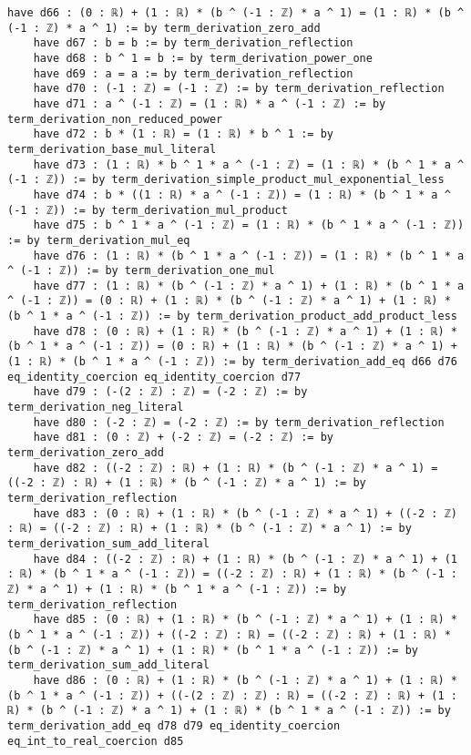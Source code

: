 \documentclass{article}
\begin{document}
\begin{tcolorbox}[colback=white!10, width=\linewidth]
\begin{lstlisting}[language=Lean4]
    have d66 : (0 : ℝ) + (1 : ℝ) * (b ^ (-1 : ℤ) * a ^ 1) = (1 : ℝ) * (b ^ (-1 : ℤ) * a ^ 1) := by term_derivation_zero_add
    have d67 : b = b := by term_derivation_reflection
    have d68 : b ^ 1 = b := by term_derivation_power_one
    have d69 : a = a := by term_derivation_reflection
    have d70 : (-1 : ℤ) = (-1 : ℤ) := by term_derivation_reflection
    have d71 : a ^ (-1 : ℤ) = (1 : ℝ) * a ^ (-1 : ℤ) := by term_derivation_non_reduced_power
    have d72 : b * (1 : ℝ) = (1 : ℝ) * b ^ 1 := by term_derivation_base_mul_literal
    have d73 : (1 : ℝ) * b ^ 1 * a ^ (-1 : ℤ) = (1 : ℝ) * (b ^ 1 * a ^ (-1 : ℤ)) := by term_derivation_simple_product_mul_exponential_less
    have d74 : b * ((1 : ℝ) * a ^ (-1 : ℤ)) = (1 : ℝ) * (b ^ 1 * a ^ (-1 : ℤ)) := by term_derivation_mul_product
    have d75 : b ^ 1 * a ^ (-1 : ℤ) = (1 : ℝ) * (b ^ 1 * a ^ (-1 : ℤ)) := by term_derivation_mul_eq
    have d76 : (1 : ℝ) * (b ^ 1 * a ^ (-1 : ℤ)) = (1 : ℝ) * (b ^ 1 * a ^ (-1 : ℤ)) := by term_derivation_one_mul
    have d77 : (1 : ℝ) * (b ^ (-1 : ℤ) * a ^ 1) + (1 : ℝ) * (b ^ 1 * a ^ (-1 : ℤ)) = (0 : ℝ) + (1 : ℝ) * (b ^ (-1 : ℤ) * a ^ 1) + (1 : ℝ) * (b ^ 1 * a ^ (-1 : ℤ)) := by term_derivation_product_add_product_less
    have d78 : (0 : ℝ) + (1 : ℝ) * (b ^ (-1 : ℤ) * a ^ 1) + (1 : ℝ) * (b ^ 1 * a ^ (-1 : ℤ)) = (0 : ℝ) + (1 : ℝ) * (b ^ (-1 : ℤ) * a ^ 1) + (1 : ℝ) * (b ^ 1 * a ^ (-1 : ℤ)) := by term_derivation_add_eq d66 d76 eq_identity_coercion eq_identity_coercion d77
    have d79 : (-(2 : ℤ) : ℤ) = (-2 : ℤ) := by term_derivation_neg_literal
    have d80 : (-2 : ℤ) = (-2 : ℤ) := by term_derivation_reflection
    have d81 : (0 : ℤ) + (-2 : ℤ) = (-2 : ℤ) := by term_derivation_zero_add
    have d82 : ((-2 : ℤ) : ℝ) + (1 : ℝ) * (b ^ (-1 : ℤ) * a ^ 1) = ((-2 : ℤ) : ℝ) + (1 : ℝ) * (b ^ (-1 : ℤ) * a ^ 1) := by term_derivation_reflection
    have d83 : (0 : ℝ) + (1 : ℝ) * (b ^ (-1 : ℤ) * a ^ 1) + ((-2 : ℤ) : ℝ) = ((-2 : ℤ) : ℝ) + (1 : ℝ) * (b ^ (-1 : ℤ) * a ^ 1) := by term_derivation_sum_add_literal
    have d84 : ((-2 : ℤ) : ℝ) + (1 : ℝ) * (b ^ (-1 : ℤ) * a ^ 1) + (1 : ℝ) * (b ^ 1 * a ^ (-1 : ℤ)) = ((-2 : ℤ) : ℝ) + (1 : ℝ) * (b ^ (-1 : ℤ) * a ^ 1) + (1 : ℝ) * (b ^ 1 * a ^ (-1 : ℤ)) := by term_derivation_reflection
    have d85 : (0 : ℝ) + (1 : ℝ) * (b ^ (-1 : ℤ) * a ^ 1) + (1 : ℝ) * (b ^ 1 * a ^ (-1 : ℤ)) + ((-2 : ℤ) : ℝ) = ((-2 : ℤ) : ℝ) + (1 : ℝ) * (b ^ (-1 : ℤ) * a ^ 1) + (1 : ℝ) * (b ^ 1 * a ^ (-1 : ℤ)) := by term_derivation_sum_add_literal
    have d86 : (0 : ℝ) + (1 : ℝ) * (b ^ (-1 : ℤ) * a ^ 1) + (1 : ℝ) * (b ^ 1 * a ^ (-1 : ℤ)) + ((-(2 : ℤ) : ℤ) : ℝ) = ((-2 : ℤ) : ℝ) + (1 : ℝ) * (b ^ (-1 : ℤ) * a ^ 1) + (1 : ℝ) * (b ^ 1 * a ^ (-1 : ℤ)) := by term_derivation_add_eq d78 d79 eq_identity_coercion eq_int_to_real_coercion d85

\end{lstlisting}
\end{tcolorbox}
\end{document}
